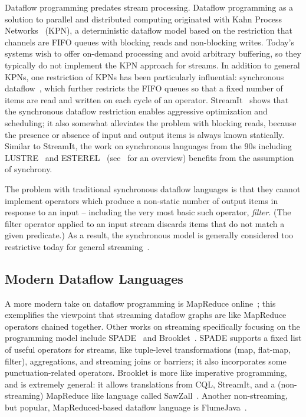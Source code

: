 Dataflow programming predates stream processing.
Dataflow programming as a solution to parallel and distributed computing
originated with Kahn Process Networks~\cite{gilles1974semantics} (KPN), a deterministic dataflow model based on the restriction that channels are FIFO queues with blocking reads and non-blocking writes. Today's systems wish to offer on-demand processing and avoid arbitrary buffering, so they typically do not implement the KPN approach for streams.
In addition to general KPNs, one restriction of KPNs has been particularly influential: synchronous dataflow~\cite{lee1987synchronous}, which further restricts the FIFO queues so that a fixed number of items are read and written on each cycle of an operator. StreamIt~\cite{thies2002streamit} shows that the synchronous dataflow restriction enables aggressive optimization and scheduling; it also somewhat alleviates the problem with blocking reads, because the presence or absence of input and output items is always known statically.
Similar to StreamIt,
the work on synchronous languages from the 90s including LUSTRE~\cite{halbwachs1991synchronous} and ESTEREL~\cite{berry1992esterel} (see~\cite{BCEHlGdS2003SL} for an overview) benefits from the assumption of
synchrony.

The problem with traditional synchronous dataflow languages is that they cannot implement operators which produce a non-static number of output items in response to an input -- including the very most basic such operator, \emph{filter}. (The filter operator applied to an input stream discards items that do not match a given predicate.) As a result, the synchronous model is generally considered too restrictive today for general streaming~\cite{schneider2013safe}.

\subsection{Modern Dataflow Languages}

A more modern take on dataflow programming is MapReduce online~\cite{condie2010mapreduce}; this exemplifies the viewpoint that streaming dataflow graphs are like MapReduce operators chained together.
Other works on streaming specifically focusing on the programming model include SPADE~\cite{gedik2008spade} and Brooklet~\cite{soule2010universal}.
SPADE supports a fixed list of useful operators for streams, like tuple-level transformations (map, flat-map, filter), aggregations, and streaming joins or barriers; it also incorporates some punctuation-related operators.
Brooklet is more like imperative programming,
and is extremely general: it allows translations from CQL, StreamIt, and a (non-streaming) MapReduce like language called SawZall~\cite{pike2005interpreting}.
Another non-streaming, but popular, MapReduced-based dataflow language
is FlumeJava~\cite{chambers2010flumejava}.


